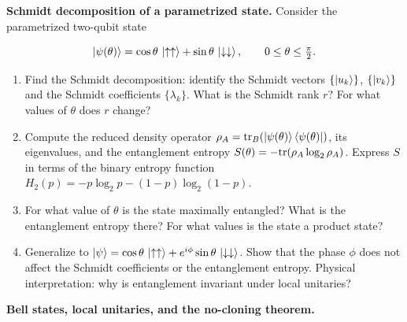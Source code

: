 \begin{problemset}
\item[Exercise 7.3] \textbf{Schmidt decomposition of a parametrized state.}
\label{item:ex-schmidt}
Consider the parametrized two-qubit state
\begin{linenomath}
\begin{equation}
\ket{\psi(\theta)} = \cos\theta\,\ket{\uparrow\uparrow} + \sin\theta\,\ket{\downarrow\downarrow},
\qquad 0 \le \theta \le \tfrac{\pi}{2}.
\end{equation}
\end{linenomath}

\begin{enumerate}
\item[(a)] Find the Schmidt decomposition: identify the Schmidt vectors $\{\ket{u_k}\}$, $\{\ket{v_k}\}$ and the Schmidt coefficients $\{\lambda_k\}$. What is the Schmidt rank $r$? For what values of $\theta$ does $r$ change?
\item[(b)] Compute the reduced density operator $\rho_A = \mathrm{tr}_B(\ket{\psi(\theta)}\bra{\psi(\theta)})$, its eigenvalues, and the entanglement entropy $S(\theta) = -\mathrm{tr}(\rho_A \log_2 \rho_A)$. Express $S$ in terms of the binary entropy function $H_2(p) = -p\log_2 p - (1-p)\log_2(1-p)$.
\item[(c)] For what value of $\theta$ is the state maximally entangled? What is the entanglement entropy there? For what values is the state a product state?
\item[(d)] Generalize to $\ket{\psi} = \cos\theta\,\ket{\uparrow\uparrow} + e^{i\phi}\sin\theta\,\ket{\downarrow\downarrow}$. Show that the phase $\phi$ does not affect the Schmidt coefficients or the entanglement entropy. Physical interpretation: why is entanglement invariant under local unitaries?
\end{enumerate}

\item[Exercise 7.4] \textbf{Bell states, local unitaries, and the no-cloning theorem.}
\label{item:ex-no-cloning}


\end{problemset}
